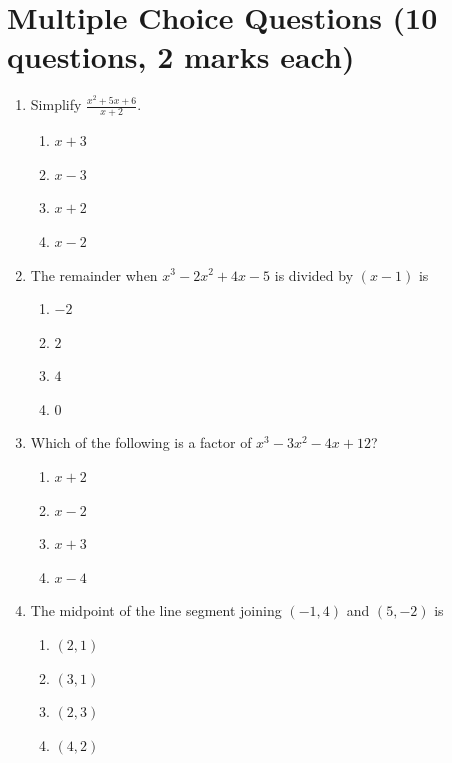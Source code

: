 \documentclass{../Templates/sbs-exam}
\begin{document}
\maketitle

\examnotice

\makemarksheet

\examtools

\newpage

\makeatletter

\section*{Multiple Choice Questions (10 questions, 2 marks each)}
\begin{enumerate}
    \item Simplify $\frac{x^2 + 5x + 6}{x+2}$.
    \begin{enumerate}
        \item $x+3$
        \item $x-3$
        \item $x+2$
        \item $x-2$
    \end{enumerate}
    
    \item The remainder when $x^3 - 2x^2 + 4x - 5$ is divided by $(x-1)$ is
    \begin{enumerate}
        \item $-2$
        \item $2$
        \item $4$
        \item $0$
    \end{enumerate}
    
    \item Which of the following is a factor of $x^3 - 3x^2 - 4x + 12$?
    \begin{enumerate}
        \item $x+2$
        \item $x-2$
        \item $x+3$
        \item $x-4$
    \end{enumerate}
    
    \item The midpoint of the line segment joining $(-1,4)$ and $(5, -2)$ is
    \begin{enumerate}
        \item $(2,1)$
        \item $(3,1)$
        \item $(2,3)$
        \item $(4,2)$
    \end{enumerate}
    

\end{enumerate}
\end{document}
